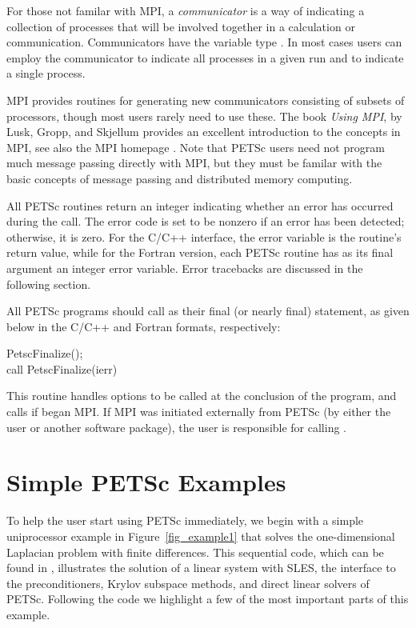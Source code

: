 For those not familar with MPI, a {\em communicator} is a way of
indicating a collection of processes that will be involved together
in a calculation or communication. Communicators have the variable type
. In most cases users can employ the communicator  to indicate all processes in a given run and  to indicate a single process.

MPI provides routines
for generating new communicators consisting of subsets of processors,
though most users rarely need to use these. The book {\em Using MPI},
by Lusk, Gropp, and Skjellum \cite{using-mpi} provides an excellent
introduction to the concepts in MPI, see also the MPI homepage 
.
Note that PETSc users need not program much message passing directly
with MPI, but they must be familar with the basic concepts of message
passing and distributed memory computing.

All PETSc routines return an integer indicating whether an error has
occurred during the call.  The error code is set to be nonzero if an
error has been detected; otherwise, it is zero.  For the C/C++
interface, the error variable is the routine's return value, while for
the Fortran version, each PETSc routine has as its final argument an
integer error variable.  Error tracebacks are discussed in the following
section.

All PETSc programs should call  
as their final (or nearly final) statement, as given below in the C/C++
and Fortran formats, respectively:
\begin{tabbing}
  PetscFinalize();\\
  call PetscFinalize(ierr)
\end{tabbing}
This routine handles options to be called at the conclusion of
the program, and calls  
if 
began MPI. If MPI was initiated externally from PETSc (by either
the user or another software package), the user is
responsible for calling . 

\section{Simple PETSc Examples}

\label{sec_simple}

To help the user start using PETSc immediately, we begin with a simple
uniprocessor example in Figure~\ref{fig_example1} that solves the
one-dimensional Laplacian problem with finite differences.  This
sequential code, which can be found in 
,
illustrates the solution of a linear system with SLES, the 
interface to the preconditioners, Krylov subspace methods, and direct
linear solvers of PETSc.  Following the code we highlight a few of the most important
parts of this example.  

